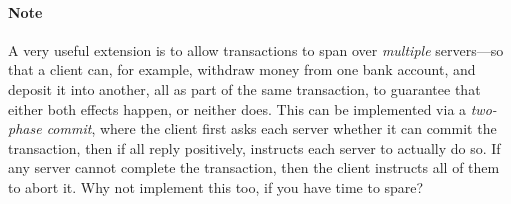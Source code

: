 \documentclass{article}
\begin{document}
\paragraph{Note}

A very useful extension is to allow transactions to span over \emph{multiple}
servers---so that a client can, for example, withdraw money from one
bank account, and deposit it into another, all as part of the same
transaction, to guarantee that either both effects happen, or neither
does. This can be implemented via a \emph{two-phase commit}, where the client
first asks each server whether it can commit the transaction, then if
all reply positively, instructs each server to actually do so. If any
server cannot complete the transaction, then the client instructs all
of them to abort it. Why not implement this too, if you have time to
spare?
\end{document}

